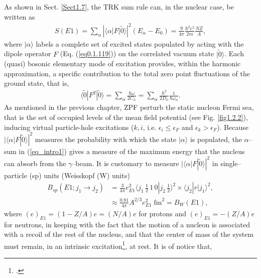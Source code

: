 As shown in Sect. \ref{Sect1.7}, the TRK sum rule can, in the nuclear case, be written as
\begin{align}\label{eq_intro1}
S(E1)=\sum_\alpha\left|\langle\alpha|F|\tilde 0\rangle\right|^2(E_\alpha-E_0)=\frac{9}{4\pi}\frac{\hbar^2e^2}{2m}\frac{NZ}{A},
\end{align}
where $|\alpha\rangle$ labels a complete set of excited  states populated by acting with the dipole operator $F$ (Eq. (\ref{eq0.1.119})) on the  correlated vacuum state $|\tilde 0\rangle$. Each (quasi) bosonic elementary mode of excitation provides, within the harmonic approximation, a specific contribution to the total zero point fluctuations of the ground state, that is,
\begin{align}\label{eqintro2}
\langle\tilde 0|F^2|\tilde 0\rangle=\sum_\alpha\frac{\hbar \omega}{2C_\alpha}=\sum_\alpha\frac{\hbar^2}{2D_\alpha}\frac{1}{\hbar\omega_\alpha}.
\end{align}
As mentioned in the previous chapter, ZPF perturb the static nucleon Fermi sea, that is the set of occupied levels of the mean field potential (see Fig. \ref{fig1.2.2}),
inducing virtual particle-hole excitations ($k,i$, i.e. $\epsilon_i\leq\epsilon_F$ and $\epsilon_k>\epsilon_F$). 
Because $|\langle \alpha|F|\tilde 0\rangle|^2$ measures the probability with which the state $|\alpha\rangle$ is populated, the $\alpha$--sum in (\ref{eq_intro1}) gives a measure of the maximum energy that the nucleus can absorb from the $\gamma$--beam. It is customary to measure  $|\langle \alpha|F|\tilde0\rangle|^2$ in single--particle (sp) units (Weisskopf (W) units)
\begin{align}\label{eq1.2.5}
\nonumber B_{sp}(E1;j_1\rightarrow j_2)&=\frac{3}{4\pi}e^2_{E1}\langle j_1\, \tfrac{1}{2}\,1\,0|j_2\,\tfrac{1}{2}\rangle^2\times \langle j_2|r|j_1\rangle^2,\\
&\approx \frac{0.81}{4\pi}A^{2/3}e^2_{E1}\;\text{fm}^2=B_W(E1),
\end{align}
where $(e)_{E1}=(1-Z/A)e=(N/A)e$ for protons and  $(e)_{E1}=-(Z/A)e$ for neutrons, in keeping with the fact that the motion of a nucleon is associated with a recoil of the rest of the nucleus,  and that the center of mass  of the system must remain,   in an intrinsic excitation\footnote{\cite{Bohr:69}.}, at rest. It is of notice that,





